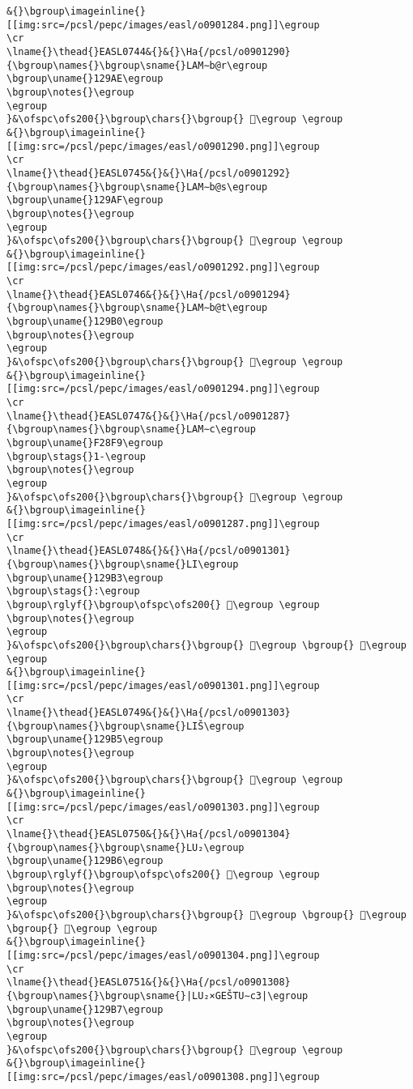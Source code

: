\begin{verbatim}
&{}\bgroup\imageinline{}[[img:src=/pcsl/pepc/images/easl/o0901284.png]]\egroup
\cr
\lname{}\thead{}EASL0744&{}&{}\Ha{/pcsl/o0901290}{\bgroup\names{}\bgroup\sname{}LAM∼b@r\egroup
\bgroup\uname{}129AE\egroup
\bgroup\notes{}\egroup
\egroup
}&\ofspc\ofs200{}\bgroup\chars{}\bgroup{} 𒦮\egroup \egroup
&{}\bgroup\imageinline{}[[img:src=/pcsl/pepc/images/easl/o0901290.png]]\egroup
\cr
\lname{}\thead{}EASL0745&{}&{}\Ha{/pcsl/o0901292}{\bgroup\names{}\bgroup\sname{}LAM∼b@s\egroup
\bgroup\uname{}129AF\egroup
\bgroup\notes{}\egroup
\egroup
}&\ofspc\ofs200{}\bgroup\chars{}\bgroup{} 𒦯\egroup \egroup
&{}\bgroup\imageinline{}[[img:src=/pcsl/pepc/images/easl/o0901292.png]]\egroup
\cr
\lname{}\thead{}EASL0746&{}&{}\Ha{/pcsl/o0901294}{\bgroup\names{}\bgroup\sname{}LAM∼b@t\egroup
\bgroup\uname{}129B0\egroup
\bgroup\notes{}\egroup
\egroup
}&\ofspc\ofs200{}\bgroup\chars{}\bgroup{} 𒦰\egroup \egroup
&{}\bgroup\imageinline{}[[img:src=/pcsl/pepc/images/easl/o0901294.png]]\egroup
\cr
\lname{}\thead{}EASL0747&{}&{}\Ha{/pcsl/o0901287}{\bgroup\names{}\bgroup\sname{}LAM∼c\egroup
\bgroup\uname{}F28F9\egroup
\bgroup\stags{}1-\egroup
\bgroup\notes{}\egroup
\egroup
}&\ofspc\ofs200{}\bgroup\chars{}\bgroup{} 󲣹\egroup \egroup
&{}\bgroup\imageinline{}[[img:src=/pcsl/pepc/images/easl/o0901287.png]]\egroup
\cr
\lname{}\thead{}EASL0748&{}&{}\Ha{/pcsl/o0901301}{\bgroup\names{}\bgroup\sname{}LI\egroup
\bgroup\uname{}129B3\egroup
\bgroup\stags{}:\egroup
\bgroup\rglyf{}\bgroup\ofspc\ofs200{} 𒦳\egroup \egroup
\bgroup\notes{}\egroup
\egroup
}&\ofspc\ofs200{}\bgroup\chars{}\bgroup{} 𒦳\egroup \bgroup{} 𒦴\egroup \egroup
&{}\bgroup\imageinline{}[[img:src=/pcsl/pepc/images/easl/o0901301.png]]\egroup
\cr
\lname{}\thead{}EASL0749&{}&{}\Ha{/pcsl/o0901303}{\bgroup\names{}\bgroup\sname{}LIŠ\egroup
\bgroup\uname{}129B5\egroup
\bgroup\notes{}\egroup
\egroup
}&\ofspc\ofs200{}\bgroup\chars{}\bgroup{} 𒦵\egroup \egroup
&{}\bgroup\imageinline{}[[img:src=/pcsl/pepc/images/easl/o0901303.png]]\egroup
\cr
\lname{}\thead{}EASL0750&{}&{}\Ha{/pcsl/o0901304}{\bgroup\names{}\bgroup\sname{}LU₂\egroup
\bgroup\uname{}129B6\egroup
\bgroup\rglyf{}\bgroup\ofspc\ofs200{} 𒦶\egroup \egroup
\bgroup\notes{}\egroup
\egroup
}&\ofspc\ofs200{}\bgroup\chars{}\bgroup{} 𒦹\egroup \bgroup{} 𒦶\egroup \bgroup{} 𒦸\egroup \egroup
&{}\bgroup\imageinline{}[[img:src=/pcsl/pepc/images/easl/o0901304.png]]\egroup
\cr
\lname{}\thead{}EASL0751&{}&{}\Ha{/pcsl/o0901308}{\bgroup\names{}\bgroup\sname{}|LU₂×GEŠTU∼c3|\egroup
\bgroup\uname{}129B7\egroup
\bgroup\notes{}\egroup
\egroup
}&\ofspc\ofs200{}\bgroup\chars{}\bgroup{} 𒦷\egroup \egroup
&{}\bgroup\imageinline{}[[img:src=/pcsl/pepc/images/easl/o0901308.png]]\egroup

\end{verbatim}

